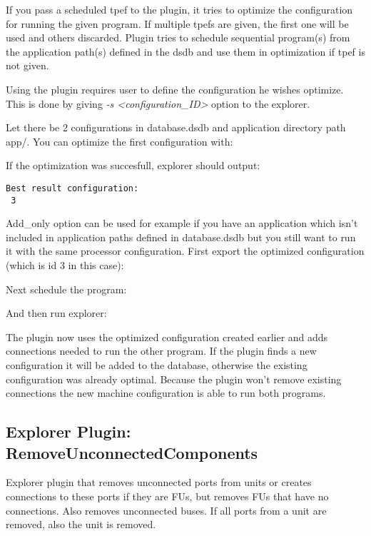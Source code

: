 \documentclass[twoside]{tceusermanual}
\begin{document}
If you pass a scheduled tpef to the plugin, it tries to optimize the configuration
for running the given program. If multiple tpefs are given, the first one will be used
and others discarded.
Plugin tries to schedule sequential program(s) from the application path(s) defined in
the dsdb and use them in optimization if tpef is not given.

Using the plugin requires user to define the configuration he wishes optimize.
This is done by giving \textit{-s <configuration\_ID>} option to the explorer.

Let there be 2 configurations in database.dsdb and application directory path app/.
You can optimize the first configuration with:


If the optimization was succesfull, explorer should output:
\begin{verbatim}
Best result configuration:
 3
\end{verbatim}
Add\_only option can be used for example if you have an application which isn't
included in application paths defined in database.dsdb but you still want to run
it with the same processor configuration.
First export the optimized configuration (which is id 3 in this case):


Next schedule the program:


And then run explorer:


The plugin now uses the optimized configuration created earlier and adds
connections needed to run the other program. If the plugin finds a new 
configuration it will be added to the database, otherwise the existing
configuration was already optimal. Because the plugin won't
remove existing connections the new machine configuration is able to run
both programs.

\subsection{Explorer Plugin: RemoveUnconnectedComponents}
Explorer plugin that removes unconnected ports from units or creates
connections to these ports if they are FUs, but removes FUs that have no 
connections. Also removes unconnected buses. If all ports from a unit 
are removed, also the unit is removed.
\end{document}
